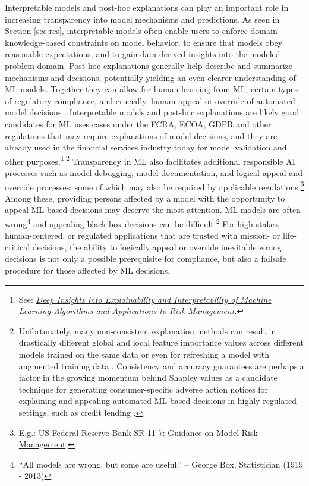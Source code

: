 \documentclass[information,article,submit,moreauthors,pdftex]{definitions/mdpi}
\begin{document}
Interpretable models and post-hoc explanations can play an important role in increasing transparency into model mechanisms and predictions. As seen in Section \ref{sec:res}, interpretable models often enable users to enforce domain knowledge-based constraints on model behavior, to ensure that models obey reasonable expectations, and to gain data-derived insights into the modeled problem domain. Post-hoc explanations generally help describe and summarize mechanisms and decisions, potentially yielding an even clearer understanding of ML models. Together they can allow for human learning from ML, certain types of regulatory compliance, and crucially, human appeal or override of automated model decisions \cite{art_and_sci}. Interpretable models and post-hoc explanations are likely good candidates for ML uses cases under the FCRA, ECOA, GDPR and other regulations that may require explanations of model decisions, and they are already used in the financial services industry today for model validation and other purposes.\footnote{See: \href{https://ww2.amstat.org/meetings/jsm/2019/onlineprogram/AbstractDetails.cfm?abstractid=303053}{\textit{Deep Insights into Explainability and Interpretability of Machine Learning Algorithms and Applications to Risk Management}}.}\textsuperscript{,}\footnote{Unfortunately, many non-consistent explanation methods can result in drastically different global and local feature importance values across different models trained on the same data or even for refreshing a model with augmented training data \cite{molnar}. Consistency and accuracy guarantees are perhaps a factor in the growing momentum behind Shapley values as a candidate technique for generating consumer-specific adverse action notices for explaining and appealing automated ML-based decisions in highly-regulated settings, such as credit lending \cite{bracke2019machine}.} Transparency in ML also facilitates additional responsible AI processes such as model debugging, model documentation, and logical appeal and override processes, some of which may also be required by applicable regulations.\footnote{E.g.: \href{https://www.federalreserve.gov/supervisionreg/srletters/sr1107.htm}{US Federal Reserve Bank SR 11-7: Guidance on Model Risk Management}.} Among these, providing persons affected by a model with the opportunity to appeal ML-based decisions may deserve the most attention. ML models are often wrong\footnote{``All models are wrong, but some are useful.'' -- George Box, Statistician (1919 - 2013)} and appealing black-box decisions can be difficult.\textsuperscript{2} For high-stakes, human-centered, or regulated applications that are trusted with mission- or life-critical decisions, the ability to logically appeal or override inevitable wrong decisions is not only a possible prerequisite for compliance, but also a failsafe procedure for those affected by ML decisions.  
\end{document}
